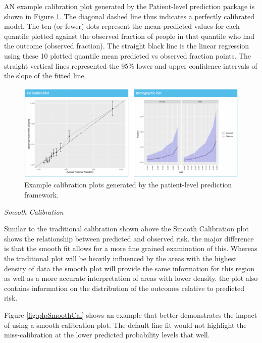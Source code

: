 \documentclass[11pt]{book}
\begin{document}
AN example calibration plot generated by the Patient-level prediction
package is shown in Figure \ref{fig:figuretheorycal}. The diagonal
dashed line thus indicates a perfectly calibrated model. The ten (or
fewer) dots represent the mean predicted values for each quantile
plotted against the observed fraction of people in that quantile who had
the outcome (observed fraction). The straight black line is the linear
regression using these 10 plotted quantile mean predicted vs observed
fraction points. The straight vertical lines represented the 95\% lower
and upper confidence intervals of the slope of the fitted line.

\begin{figure}
\includegraphics[width=1\linewidth]{images/PatientLevelPrediction/theory/calibration} \caption{Example calibration plots generated by the patient-level prediction framework.}\label{fig:figuretheorycal}
\end{figure}

\emph{Smooth Calibration}

Similar to the traditional calibration shown above the Smooth
Calibration plot shows the relationship between predicted and observed
risk. the major difference is that the smooth fit allows for a more fine
grained examination of this. Whereas the traditional plot will be
heavily influenced by the areas with the highest density of data the
smooth plot will provide the same information for this region as well as
a more accurate interpretation of areas with lower density. the plot
also contains information on the distribution of the outcomes relative
to predicted risk.

Figure \ref{fig:plpSmoothCal} shows an example that better demonstrates
the impact of using a smooth calibration plot. The default line fit
would not highlight the miss-calibration at the lower predicted
probability levels that well.
\end{document}
